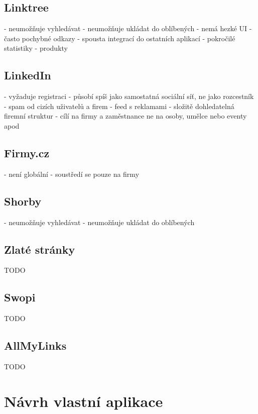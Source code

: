 	\subsection{Linktree}
	- neumožňuje vyhledávat
	- neumožňuje ukládat do oblíbených
	- nemá hezké UI
	- často pochybné odkazy
	- spousta integrací do ostatních aplikací
	- pokročilé statistiky
	- produkty

	\subsection{LinkedIn}

	- vyžaduje registraci
	- působí spíš jako samostatná sociální síť, ne jako rozcestník
	- spam od cizích uživatelů a firem
	- feed s reklamami
	- složitě dohledatelná firemní struktur
	- cílí na firmy a zaměstnance ne na osoby, umělce nebo eventy apod

	\subsection{Firmy.cz}

	- není globální
	- soustředí se pouze na firmy

	\subsection{Shorby}

	- neumožňuje vyhledávat
	- neumožňuje ukládat do oblíbených

	\subsection{Zlaté stránky}

	TODO

	\subsection{Swopi}

	TODO

	\subsection{AllMyLinks}

	TODO


\section{Návrh vlastní aplikace}

